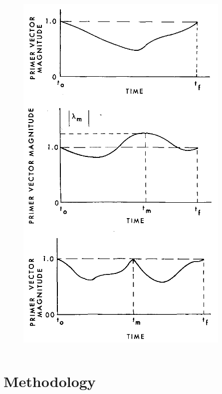 \documentclass{beamer}
\begin{document}
\begin{frame}
\begin{columns}
\begin{column}{0.3\linewidth}
\begin{figure}[htbp]
                \includegraphics[width=\linewidth]{img/primer_vector_history_from_jezewsky.png}
            \end{figure}
        \end{column}
    \end{columns}      
\end{frame}

\section{Methodology}
\end{document}
